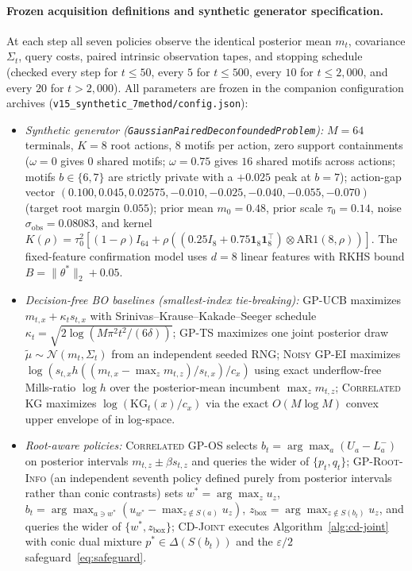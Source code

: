 \documentclass{article}
\theoremstyle{plain}
\theoremstyle{definition}
\begin{document}
\paragraph{Frozen acquisition definitions and synthetic generator specification.}
At each step all seven policies observe the identical posterior mean $m_t$, covariance $\Sigma_t$, query costs, paired intrinsic observation tapes, and stopping schedule (checked every step for $t\le 50$, every $5$ for $t\le 500$, every $10$ for $t\le 2{,}000$, and every $20$ for $t>2{,}000$). All parameters are frozen in the companion configuration archives (\texttt{v15\_synthetic\_7method/config.json}):
\begin{itemize}[leftmargin=1.4em,itemsep=1pt,topsep=2pt]
\item \emph{Synthetic generator (\texttt{GaussianPairedDeconfoundedProblem}):} $M=64$ terminals, $K=8$ root actions, $8$ motifs per action, zero support containments ($\omega=0$ gives $0$ shared motifs; $\omega=0.75$ gives $16$ shared motifs across actions; motifs $b\in\{6,7\}$ are strictly private with a $+0.025$ peak at $b=7$); action-gap vector $(0.100,0.045,0.02575,-0.010,-0.025,-0.040,-0.055,-0.070)$ (target root margin $0.055$); prior mean $m_0=0.48$, prior scale $\tau_0=0.14$, noise $\sigma_{\mathrm{obs}}=0.08083$, and kernel $K(\rho)=\tau_0^2[(1-\rho)I_{64}+\rho((0.25 I_8+0.75\mathbf{1}_8\mathbf{1}_8^\top)\otimes\mathrm{AR1}(8,\rho))]$. The fixed-feature confirmation model uses $d=8$ linear features with RKHS bound $B=\|\theta^*\|_2+0.05$.
\item \emph{Decision-free BO baselines (smallest-index tie-breaking):} \textsc{GP-UCB} maximizes $m_{t,x}+\kappa_t s_{t,x}$ with Srinivas--Krause--Kakade--Seeger schedule $\kappa_t=\sqrt{2\log(M\pi^2 t^2/(6\delta))}$; \textsc{GP-TS} maximizes one joint posterior draw $\widetilde\mu\sim\mathcal N(m_t,\Sigma_t)$ from an independent seeded RNG; \textsc{Noisy GP-EI} maximizes $\log(s_{t,x} h((m_{t,x}-\max_z m_{t,z})/s_{t,x})/c_x)$ using exact underflow-free Mills-ratio $\log h$ over the posterior-mean incumbent $\max_z m_{t,z}$; \textsc{Correlated KG} maximizes $\log(\mathrm{KG}_t(x)/c_x)$ via the exact $O(M\log M)$ convex upper envelope of \citet{frazier2009kg} in log-space.
\item \emph{Root-aware policies:} \textsc{Correlated GP-OS} selects $b_t=\arg\max_a(U_a-L_a^-)$ on posterior intervals $m_{t,z}\pm\beta s_{t,z}$ and queries the wider of $\{p_t,q_t\}$; \textsc{GP-Root-Info} (an independent seventh policy defined purely from posterior intervals rather than conic contrasts) sets $w^*=\arg\max_z u_z$, $b_t=\arg\max_{a\ni w^*}(u_{w^*}-\max_{z\notin S(a)} u_z)$, $z_{\mathrm{box}}=\arg\max_{z\notin S(b_t)} u_z$, and queries the wider of $\{w^*,z_{\mathrm{box}}\}$; \textsc{CD-Joint} executes Algorithm~\ref{alg:cd-joint} with conic dual mixture $p^*\in\Delta(S(b_t))$ and the $\varepsilon/2$ safeguard~\eqref{eq:safeguard}.
\end{itemize}
\end{document}
